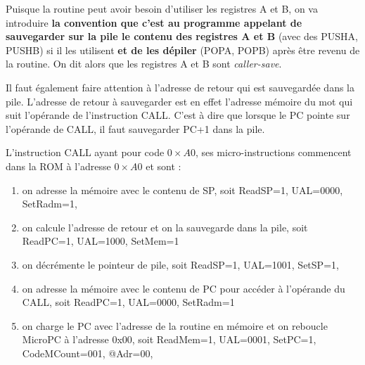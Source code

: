 Puisque la routine peut avoir besoin d'utiliser les registres A et B, on va introduire \textbf{la convention que c'est au programme appelant de sauvegarder sur la pile le contenu des registres A et B} (avec des PUSHA, PUSHB) si il les utilisent \textbf{et de les dépiler} (POPA, POPB) après être revenu de la routine. On dit alors que les registres A et B sont \emph{caller-save}. 


Il faut également faire attention à l'adresse de retour qui est sauvegardée dans la pile. L'adresse de retour à sauvegarder est en effet l'adresse mémoire du mot qui suit l'opérande de l'instruction CALL. C'est à dire que lorsque le PC pointe sur l'opérande de CALL, il faut sauvegarder PC+1 dans la pile.

L'instruction CALL ayant pour code $0\times A0$, ses micro-instructions commencent dans la ROM à l'adresse $0\times A0$ et sont :
\begin{enumerate}
\item on adresse la mémoire avec le contenu de SP, soit ReadSP=1, UAL=0000, SetRadm=1,%
\item on calcule l'adresse de retour et on la sauvegarde dans la pile, soit ReadPC=1, UAL=1000, SetMem=1 %
\item on décrémente le pointeur de pile, soit ReadSP=1, UAL=1001, SetSP=1, %
\item on adresse la mémoire avec le contenu de PC pour accéder à l'opérande du CALL, soit ReadPC=1, UAL=0000, SetRadm=1 %
\item on charge le PC avec l'adresse de la routine en mémoire et on reboucle MicroPC à l'adresse 0x00, soit ReadMem=1, UAL=0001, SetPC=1, CodeMCount=001, @Adr=00,%
\end{enumerate}




